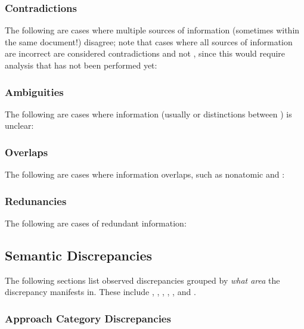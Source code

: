\subsubsection{Contradictions}
\label{contra}
The following are cases where multiple sources of information (sometimes within
the same document!) disagree; note that cases where all sources of information
are incorrect are considered contradictions and not , since this
would require analysis that has not been performed yet:



\subsubsection{Ambiguities}
\label{ambi}
The following are cases where information (usually  or distinctions
between \terms{}) is unclear:



\subsubsection{Overlaps}
\label{over}
The following are cases where information overlaps, such as nonatomic 
and \terms{}:



\ifnotpaper
    \subsubsection{Redunancies}
    \label{redun}
    The following are cases of redundant information:

    
\fi

\subsection{Semantic Discrepancies}
\label{smntcDiscreps}

The following sections list observed discrepancies grouped by \emph{what area}
the discrepancy manifests in. These include , ,
, , , and .

\subsubsection{Approach Category Discrepancies}
\label{cats}

